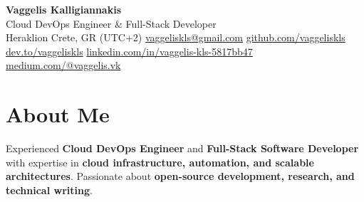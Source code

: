 \documentclass[a4paper,10pt]{article}
\begin{document}
\pagestyle{empty}


\begin{center}
    {\huge \textbf{Vaggelis Kalligiannakis} } \\
    \vspace{7pt}
    {\large Cloud DevOps Engineer \& Full-Stack Developer} \\
    \vspace{7pt}
     Heraklion Crete, GR (UTC+2) \quad
     \href{mailto:vaggeliskls@gmail.com}{vaggeliskls@gmail.com} \quad
     \href{https://github.com/vaggeliskls}{github.com/vaggeliskls} \quad
     \href{https://dev.to/vaggeliskls}{dev.to/vaggeliskls} \quad
     \href{https://www.linkedin.com/in/vaggelis-kls-5817bb47/}{linkedin.com/in/vaggelis-kls-5817bb47} \quad
     \href{https://medium.com/@vaggelis.vk}{medium.com/@vaggelis.vk}
\end{center}

\vspace{4pt}


\section*{ About Me}
Experienced \textbf{Cloud DevOps Engineer} and \textbf{Full-Stack Software Developer} with expertise in \textbf{cloud infrastructure, automation, and scalable architectures}.  
Passionate about \textbf{open-source development, research, and technical writing}.

\vspace{2pt}

\end{document}
